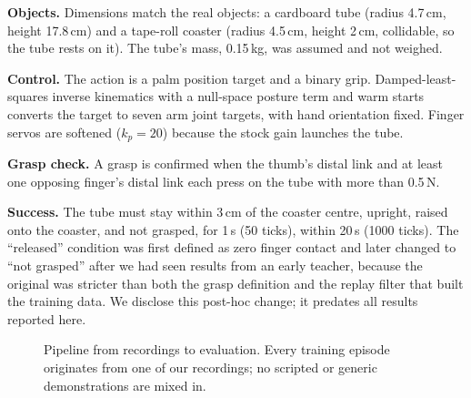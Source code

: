 \documentclass[10pt,twocolumn]{article}
\begin{document}
\textbf{Objects.} Dimensions match the real objects: a cardboard tube (radius 4.7\,cm, height 17.8\,cm) and a
tape-roll coaster (radius 4.5\,cm, height 2\,cm, collidable, so the tube rests on it). The tube's mass, 0.15\,kg,
was assumed and not weighed.

\textbf{Control.} The action is a palm position target and a binary grip. Damped-least-squares inverse kinematics
with a null-space posture term and warm starts converts the target to seven arm joint targets, with hand orientation
fixed. Finger servos are softened ($k_p = 20$) because the stock gain launches the tube.

\textbf{Grasp check.} A grasp is confirmed when the thumb's distal link and at least one opposing finger's distal
link each press on the tube with more than 0.5\,N.

\textbf{Success.} The tube must stay within 3\,cm of the coaster centre, upright, raised onto the coaster, and not
grasped, for 1\,s (50 ticks), within 20\,s (1000 ticks). The ``released'' condition was first defined as zero finger
contact and later changed to ``not grasped'' after we had seen results from an early teacher, because the original
was stricter than both the grasp definition and the replay filter that built the training data. We disclose this
post-hoc change; it predates all results reported here.

\begin{figure}[t]
\centering
{}
\caption{Pipeline from recordings to evaluation. Every training episode originates from one of our recordings; no
scripted or generic demonstrations are mixed in.}
\label{fig:pipeline}
\end{figure}
\end{document}
